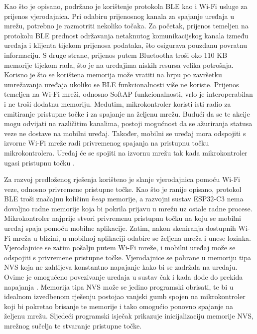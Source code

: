 Kao što je opisano, podržano je korištenje protokola BLE kao i Wi-Fi usluge za prijenos vjerodajnica. Pri odabiru prijenosnog kanala za spajanje uređaja u mrežu, potrebno je razmotriti nekoliko točaka. Za početak, prijenos temeljen na protokolu BLE prednost održavanja netaknutog komunikacijskog kanala između uređaja i klijenta tijekom prijenosa podataka, što osigurava pouzdanu povratnu informaciju. S druge strane, prijenos putem Bluetootha troši oko 110 KB memorije tijekom rada, što je na uređajima niskih resursa velika potrošnja. Korisno je što se korištena memorija može vratiti na hrpu  po završetku umrežavanja uređaja ukoliko se BLE funkcionalnosti više ne koriste. Prijenos temeljen na Wi-Fi mreži, odnosno SoftAP funkcionalnosti, vrlo je interoperabilan i ne troši dodatnu memoriju. Međutim, mikrokontroler koristi isti radio za emitiranje pristupne točke i za spajanje na željenu mrežu. Budući da se te akcije mogu odvijati na različitim kanalima, postoji mogućnost da se ažuriranja statusa veze ne dostave na mobilni uređaj. Također, mobilni se uređaj mora odspojiti s izvorne Wi-Fi mreže radi privremenog spajanja na pristupnu točku mikrokontrolera. Uređaj će se spojiti na izvornu mrežu tak kada mikrokontroler ugasi pristupnu točku \cite{unified_provisioning}. 

Za razvoj predloženog rješenja korišteno je slanje vjerodajnica pomoću Wi-Fi veze, odnosno privremene pristupne točke. Kao što je ranije opisano, protokol BLE troši značajnu količinu \textit{heap} memorije, a razvojni sustav ESP32-C3 nema dovoljno radne memorije koja bi pokrila prijavu u mrežu uz ostale radne procese. Mikrokontroler najprije stvori privremenu pristupnu točku na koju se mobilni uređaj spaja pomoću mobilne aplikacije. Zatim, nakon skeniranja dostupnih Wi-Fi mreža u blizini, u mobilnoj aplikaciji odabire se željena mreža i unese lozinka. Vjerodajnice se zatim pošalju putem Wi-Fi mreže, i mobilni uređaj može se odspojiti s privremene pristupne točke. Vjerodajnice se pohrane u memoriju tipa NVS  koja ne zahtijeva konstantno napajanje kako bi se zadržala na uređaju. Ovime je omogućeno povezivanje uređaja u sustav čak i kada dođe do prekida napajanja \cite{what_is_nvs}. Memorija tipa NVS može se jedino programski obrisati, te bi u idealnom izvedbenom rješenju postojao vanjski gumb spojen na mikrokontroler koji bi pokretao brisanje te memorije i tako omogućio ponovno spajanje na željenu mrežu. Sljedeći programski isječak prikazuje inicijalizaciju memorije NVS, mrežnog sučelja te stvaranje pristupne točke.

